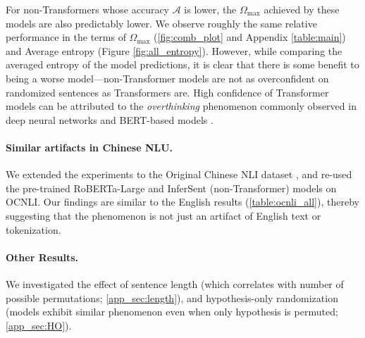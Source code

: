 \documentclass[11pt,a4paper]{article}
\begin{document}


For non-Transformers whose accuracy $\mathcal{A}$ is lower, the $\Omega_{\text{max}}$ achieved by these models are also predictably lower. We observe roughly the same relative performance in the terms of $\Omega_{\text{max}}$ (\autoref{fig:comb_plot} and Appendix \autoref{table:main}) and Average entropy (Figure \ref{fig:all_entropy}). However, while comparing the averaged entropy of the model predictions, it is clear that there is some benefit to being a worse model---non-Transformer models are not as overconfident on randomized sentences as Transformers are. 
High confidence of Transformer models can be attributed to the \textit{overthinking} phenomenon commonly observed in deep neural networks \cite{kaya2019shallowdeep} and BERT-based models \cite{zhou2020bert}.


\paragraph{Similar artifacts in Chinese NLU.}

We extended the experiments to the Original Chinese NLI dataset \citep[OCNLI]{hu-etal-2020-ocnli}, and re-used the pre-trained RoBERTa-Large and InferSent (non-Transformer) models on OCNLI. Our findings are similar to the English results (\autoref{table:ocnli_all}), thereby suggesting that the phenomenon is not just an artifact of English text or tokenization.




\paragraph{Other Results.} We investigated the effect of sentence length (which correlates with number of possible permutations; \autoref{app_sec:length}), and hypothesis-only randomization (models exhibit similar phenomenon even when only hypothesis is permuted; \autoref{app_sec:HO}).
\end{document}
